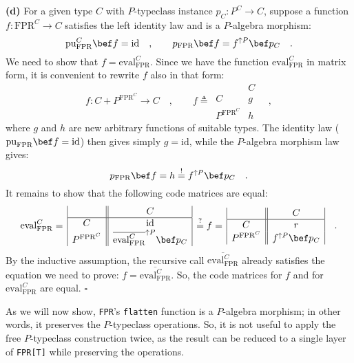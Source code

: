 \textbf{(d)} For a given type $C$ with $P$-typeclass instance $p_{C}:P^{C}\rightarrow C$,
suppose a function $f:\text{FPR}^{C}\rightarrow C$ satisfies the
left identity law and is a $P$-algebra morphism:
\[
\text{pu}_{\text{FPR}}^{C}\bef f=\text{id}\quad,\quad\quad p_{\text{FPR}}\bef f=f^{\uparrow P}\bef p_{C}\quad.
\]
We need to show that $f=\text{eval}_{\text{FPR}}^{C}$. Since we have
the function $\text{eval}_{\text{FPR}}^{C}$ in matrix form, it is
convenient to rewrite $f$ also in that form:
\[
f:C+P^{\text{FPR}^{C}}\rightarrow C\quad,\quad\quad f\triangleq\,\begin{array}{|c||c|}
 & C\\
\hline C & g\\
P^{\text{FPR}^{C}} & h
\end{array}\quad,
\]
where $g$ and $h$ are new arbitrary functions of suitable types.
The identity law ($\text{pu}_{\text{FPR}}\bef f=\text{id}$) then
gives simply $g=\text{id}$, while the $P$-algebra morphism law gives:
\[
p_{\text{FPR}}\bef f=h\overset{!}{=}f^{\uparrow P}\bef p_{C}\quad.
\]
It remains to show that the following code matrices are equal:
\[
\text{eval}_{\text{FPR}}^{C}=\,\begin{array}{|c||c|}
 & C\\
\hline C & \text{id}\\
P^{\text{FPR}^{C}} & \overline{\text{eval}_{\text{FPR}}^{C}}^{\uparrow P}\bef p_{C}
\end{array}\,\overset{?}{=}f=\,\begin{array}{|c||c|}
 & C\\
\hline C & r\\
P^{\text{FPR}^{C}} & f^{\uparrow P}\bef p_{C}
\end{array}\quad.
\]
By the inductive assumption, the recursive call $\overline{\text{eval}_{\text{FPR}}^{C}}$
already satisfies the equation we need to prove: $f=\overline{\text{eval}_{\text{FPR}}^{C}}$.
So, the code matrices for $f$ and for $\text{eval}_{\text{FPR}}^{C}$
are equal. $\square$ 

As we will now show, \lstinline!FPR!\textsf{'}s
\lstinline!flatten! function
is a $P$-algebra morphism; in other words, it preserves the $P$-typeclass
operations. So, it is not useful to apply the free $P$-typeclass
construction twice, as the result can be reduced to a single layer
of \lstinline!FPR[T]! while
preserving the operations.

